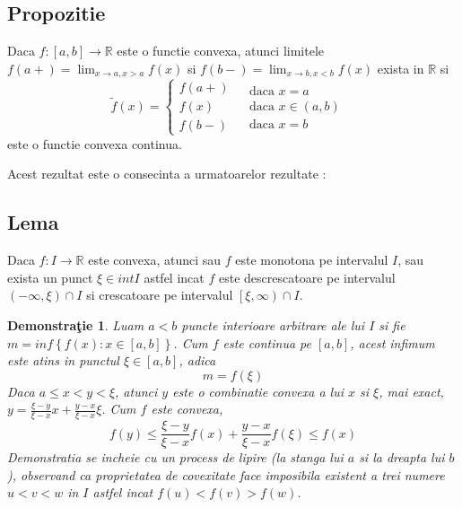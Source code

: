 \documentclass[a4paper,12pt,oneside]{report}
\newtheorem{demonstration}{Demonstra\c tie}
\begin{document}
\subsection{Propozitie}
Daca \(f: \left [ a, b \right ]\rightarrow \mathbb{R}\) este o functie convexa, atunci limitele \(f\left ( a+ \right ) = \lim_{x\rightarrow a, x> a}f\left ( x \right )\)  si \(f\left ( b- \right ) = \lim_{x\rightarrow b, x< b}f\left ( x \right )\) exista in \(\mathbb{R}\) si
\begin{displaymath}
  \tilde{f}\left ( x \right )= \left\{\begin{matrix}
f\left ( a+ \right ) & \\ 
 f\left ( x \right )& \\ 
 f\left ( b- \right )& 
\end{matrix} \begin{matrix}
\text{daca } x=a & \\ 
\text{daca } x\in \left ( a,b \right ) & \\ 
\text{daca } x= b& 
\end{matrix}\right.
\end{displaymath}
 este o functie convexa continua. 

	Acest rezultat este o consecinta a urmatoarelor rezultate :


\subsection{Lema}

Daca \(f: I \rightarrow \mathbb{R}\) este convexa, atunci sau \(f\) este monotona pe intervalul \(I\), sau exista un punct \(\xi \in int I\) astfel incat \(f\) este descrescatoare pe intervalul \(\left ( -\infty , \xi  \right )\cap I\) si crescatoare pe intervalul \(\left[\xi , \infty  \right )\cap I\).

\begin{demonstration}
Luam \(a < b\) puncte interioare arbitrare ale lui \(I\) si fie 
\(m = inf\left \{ f\left ( x \right )  : x\in \left [ a,b \right ]\right \}\). Cum \(f\) este continua pe \(\left [ a,b \right ]\), acest infimum este atins in punctul \(\xi \in \left [ a,b \right ]\), adica 
\begin{displaymath}
  m = f\left ( \xi  \right )
\end{displaymath}
Daca \(a \leq x <  y< \xi\), atunci \(y\) este o combinatie convexa a lui \(x\) si \(\xi\), mai exact, \(y = \frac{\xi -y}{\xi -x}x + \frac{y - x}{\xi -x}\xi\). Cum \(f\) este convexa, 
\begin{displaymath}
  f\left ( y \right )\leq \frac{\xi -y}{\xi -x}f\left ( x \right )+ \frac{y-x}{\xi -x}f\left ( \xi  \right )\leq f\left ( x \right ) 
\end{displaymath}
Demonstratia se incheie cu un process de lipire (la stanga lui \(a\) si la dreapta lui \(b\)), observand ca proprietatea de covexitate face imposibila existent a trei numere \(u < v < w\) in \(I\) astfel incat \(f\left ( u \right ) < f\left ( v \right )> f\left ( w \right )\). 
\end{demonstration}
\end{document}
